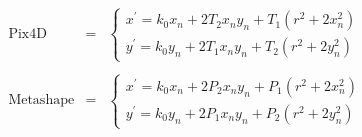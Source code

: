 \begin{equation}
  \begin{array}{lll}
    \text{Pix4D} & = &
    \begin{cases}
      x^\prime = k_0 x_n + 2 T_2 x_n y_n + T_1(r^2 + 2 x_n^2) \\
      y^\prime = k_0 y_n + 2 T_1 x_n y_n + T_2(r^2 + 2 y_n^2)
    \end{cases}
  
  \\ \\

  \text{Metashape} & = &
    \begin{cases}
      x^\prime = k_0 x_n + 2 P_2 x_n y_n + P_1(r^2 + 2 x_n^2) \\
      y^\prime = k_0 y_n + 2 P_1 x_n y_n + P_2(r^2 + 2 y_n^2)
    \end{cases}
  \end{array}
\label{eq:idp8}
\end{equation}
